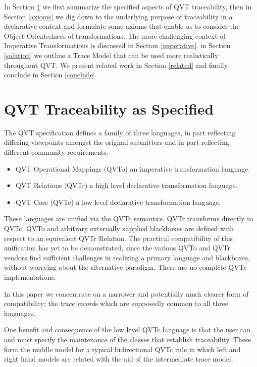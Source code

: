 \documentclass[runningheads,a4paper]{llncs}
\begin{document}
In Section \ref{qvt-spec} we first summarize the specified aspects of QVT traceability, then in Section \ref{axioms} we dig down to the underlying purpose of traceability in a declarative context and formulate some axioms that enable us to consider the Object-Orientedness of transformations. The more challenging context of Imperative Transformations is discussed in Section \ref{imperative}. in Section \ref{solution} we outline a Trace Model that can be used more realistically throughout QVT. We present related work in Section \ref{related} and finally conclude in Section \ref{conclude}.

\section{QVT Traceability as Specified}\label{qvt-spec}

The QVT specification defines a family of three languages, in part reflecting differing viewpoints amongst the original submitters and in part reflecting different community requirements. 
\begin{itemize}
\item QVT Operational Mappings (QVTo) an imperative transformation language.
\item QVT Relations (QVTr) a high level declarative transformation language.
\item QVT Core (QVTc) a low level declarative transformation language.
\end{itemize}

These languages are unified via the QVTc semantics. QVTr transforms directly to QVTc. QVTo and arbitrary externally supplied blackboxes are defined with respect to an equivalent QVTr Relation. The practical compatibility of this unification has yet to be demonstrated, since the various QVTo and QVTr vendors find sufficient challenges in realizing a primary language and blackboxes, without worrying about the alternative paradigm. There are no complete QVTc implementations.

In this paper we concentrate on a narrower and potentially much clearer form of compatibility; the \emph{trace record}s which are supposedly common to all three languages.

One benefit and consequence of the low level QVTc language is that the user can and must specify the
maintenance of the classes that establish traceability. These form the middle model for a typical bidirectional
QVTc rule in which left and right hand models are related with the aid of the intermediate trace model.
\end{document}
